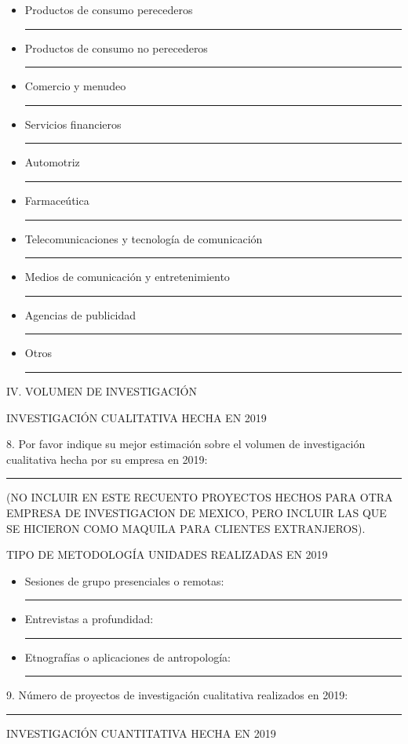 \begin{itemize}
    \item[a)] Productos de consumo perecederos \rule{20mm}{0.1mm}
\item[b)] Productos de consumo no perecederos \rule{20mm}{0.1mm}
\item[c)] Comercio y menudeo \rule{20mm}{0.1mm}
\item[d)] Servicios financieros \rule{20mm}{0.1mm}
\item[e)] Automotriz \rule{20mm}{0.1mm}
\item[f)] Farmaceútica \rule{20mm}{0.1mm}
\item[g)] Telecomunicaciones y tecnología de comunicación \rule{20mm}{0.1mm}
\item[h)] Medios de comunicación y entretenimiento \rule{20mm}{0.1mm}
\item[i)] Agencias de publicidad \rule{20mm}{0.1mm}
\item[j)] Otros \rule{20mm}{0.1mm}
\end{itemize} 
IV. VOLUMEN DE INVESTIGACIÓN \newline

INVESTIGACIÓN CUALITATIVA HECHA EN 2019 \newline

8. Por favor indique su mejor estimación sobre el volumen de investigación cualitativa hecha por su empresa en 2019: \rule{20mm}{0.1mm} (NO INCLUIR EN ESTE RECUENTO PROYECTOS HECHOS PARA OTRA EMPRESA DE INVESTIGACION DE MEXICO, PERO INCLUIR LAS QUE SE HICIERON COMO MAQUILA PARA CLIENTES EXTRANJEROS).\newline

TIPO DE METODOLOGÍA \newline
UNIDADES REALIZADAS EN 2019 

\begin{itemize}
    \item Sesiones de grupo presenciales o remotas: \rule{20mm}{0.1mm}
\item Entrevistas a profundidad: \rule{20mm}{0.1mm}
\item Etnografías o aplicaciones de antropología: \rule{20mm}{0.1mm}
\end{itemize} 

9. Número de proyectos de investigación cualitativa realizados en 2019: \rule{20mm}{0.1mm} \newline 

INVESTIGACIÓN CUANTITATIVA HECHA EN 2019 \newline

